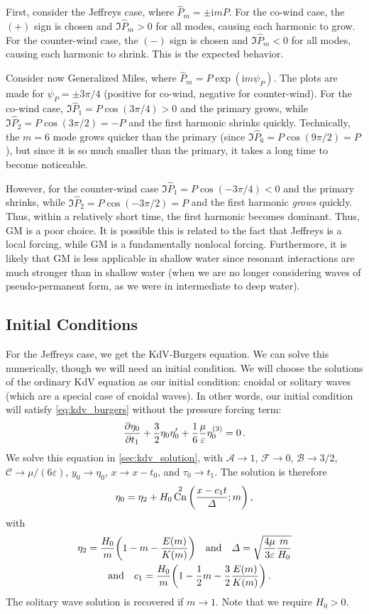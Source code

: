 \documentclass{jfm}
\let\Oldsubsection\subsection
\renewcommand{\subsection}{\FloatBarrier\Oldsubsection}
\newcommand{\GenP}{\hat{P}_m}
\newcommand{\POne}{\hat{P}_1}
\newcommand{\PTwo}{\hat{P}_2}
\DeclareMathOperator{\cn}{Cn}
\newcommand{\im}{\mathrm{i}}
\renewcommand*{\epsilon}{\varepsilon}
\begin{document}
First, consider the Jeffreys case, where $\GenP = \pm \im m P$.
For the co-wind case, the $(+)$ sign is chosen and $\Im{\GenP} > 0$ for
all modes, causing each harmonic to grow.
For the counter-wind case, the $(-)$ sign is chosen and $\Im{\GenP} < 0$
for all modes, causing each harmonic to shrink.
This is the expected behavior.

Consider now Generalized Miles, where $\GenP = P \exp(\im m \psi_P)$.
The plots are made for $\psi_P = \pm 3\pi/4$ (positive for
co-wind, negative for counter-wind).
For the co-wind case, $\Im{\POne} = P \cos(3\pi/4) > 0$ and the primary
grows, while $\Im{\PTwo} = P \cos(3\pi/2) = -P$ and the first harmonic
shrinks quickly.
Technically, the $m=6$ mode grows quicker than the primary (since
$\Im{\hat{P}_6} = P \cos(9\pi/2) = P$), but since it is so much smaller
than the primary, it takes a long time to become noticeable.

However, for the counter-wind case $\Im{\POne} = P \cos(-3\pi/4) < 0$ and the primary
shrinks, while $\Im{\PTwo} = P \cos(-3\pi/2) = P$ and the first harmonic
\emph{grows} quickly.
Thus, within a relatively short time, the first harmonic becomes
dominant.
Thus, GM is a poor choice.
It is possible this is related to the fact that Jeffreys is a local
forcing, while GM is a fundamentally nonlocal forcing.
Furthermore, it is likely that GM is less applicable in shallow water
since resonant interactions are much stronger than in shallow water
(when we are no longer considering waves of pseudo-permanent form, as we
were in intermediate to deep water).

\subsection{Initial Conditions}
For the Jeffreys case, we get the KdV-Burgers equation.
We can solve this numerically, though we will need an initial condition.
We will choose the solutions of the ordinary KdV equation as our initial
condition: cnoidal or solitary waves (which are a special case of
cnoidal waves).
In other words, our initial condition will satisfy \cref{eq:kdv_burgers}
without the pressure forcing term:
\begin{equation}
   \pdv{\eta_0}{t_1} + \frac{3}{2} \eta_0 \eta_0' + \frac{1}{6}
   \frac{\mu}{\epsilon} \eta_0^{(3)} = 0 \,.
\end{equation}
We solve this equation in \cref{sec:kdv_solution}, with $\mathcal{A} \to
1$, $\mathcal{F} \to 0$, $\mathcal{B} \to 3/2$, $\mathcal{C} \to \mu/(6
\epsilon)$, $y_0 \to \eta_0$, $x \to x - t_0$, and $\tau_0 \to t_1$.
The solution is therefore
\begin{equation}
  \eta_0 = \eta_2 + H_0 \cn^2\pqty{\frac{x-c_1 t}{\Delta}; m} \,,
\end{equation}
with
\begin{gather}
  \eta_2 = \frac{H_0}{m} \pqty{1 - m - \frac{E(m)}{K(m)}}
  \qq{and}
  \Delta = \sqrt{\frac{4 \mu}{3 \epsilon} \frac{m}{H_0}}
  \\
  \qq{and}
  c_1 = \frac{H_0}{m} \pqty{1 - \frac{1}{2} m - \frac{3}{2}
    \frac{E(m)}{K(m)}} \,.
\end{gather}
The solitary wave solution is recovered if $m \to 1$.
Note that we require $H_0 > 0$.
\end{document}
